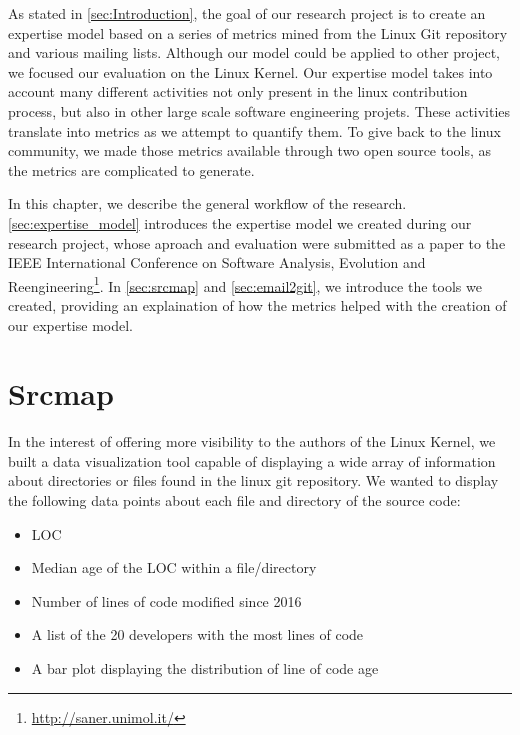 \label{sec:Theme1}



As stated in \autoref{sec:Introduction}, the goal of our research project is to create an expertise model based on a series of metrics mined from the Linux Git repository and various mailing lists. Although our model could be applied to other project, we focused our evaluation on the Linux Kernel.
Our expertise model takes into account many different activities not only present in the linux contribution process, but also in other large scale software engineering projets. These activities translate into metrics as we attempt to quantify them. To give back to the linux community, we made those metrics available through two open source tools, as the metrics are complicated to generate.  

In this chapter, we describe the general workflow of the research. \autoref{sec:expertise_model} introduces the expertise model we created during our research project, whose aproach and evaluation were submitted as a paper to the IEEE International Conference on Software Analysis, Evolution and Reengineering\footnote{\url{http://saner.unimol.it/}}. In \autoref{sec:srcmap} and \autoref{sec:email2git}, we introduce the tools we created, providing an explaination of how the metrics helped with the creation of our expertise model. 





\section{Srcmap}
\label{sec:srcmap}

In the interest of offering more visibility to the authors of the Linux Kernel, we built a data visualization tool capable of displaying a wide array of information about directories or files found in the linux git repository. We wanted to display the following data points about each file and directory of the source code:

\begin{itemize}
	\item \ac{LOC}
	\item Median age of the \ac{LOC} within a file/directory
	\item Number of lines of code modified since 2016
	\item A list of the 20 developers with the most lines of code
	\item A bar plot displaying the distribution of line of code age
\end{itemize}

